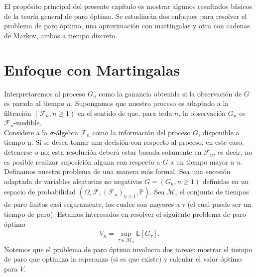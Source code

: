 El propósito principal del presente capítulo es mostrar algunos resultados básicos de la teoría general de paro óptimo. Se estudiarán dos enfoques para resolver el problema de paro óptimo, una aproximación con martingalas y otra con cadenas de Markov, ambos a tiempo discreto. 


\section{Enfoque con Martingalas}
Interpretaremos al proceso $G_n$ como la ganancia obtenida si la observación de $G$ es parada al tiempo $n$. Supongamos que nuestro proceso es adaptado a la filtración $(\mathcal{F}_n, n \geq 1)$ en el sentido de que, para toda $n$, la observación $G_n$ es $\mathcal{F}_n$-medible. \\

Considere a la $\sigma$-álgebra $\mathcal{F}_n$ como la información del proceso $G$, disponible a tiempo n. Si se desea tomar una decisión con respecto al proceso, en este caso, detenerse o no; esta resolución deberá estar basada solamente en $\mathcal{F}_n$, es decir, no es posible realizar suposición alguna con respecto a $G$ a un tiempo mayor a $n$. \\

Definamos nuestro problema de una manera más formal. Sea una sucesión adaptada de variables aleatorias no negativas $G = (G_n, n \geq 1)$ definidas en un espacio de probabilidad $(\Omega, \mathcal{F}, (\mathcal{F}_n)_{n \geq 1}, \mathbb{P})$. Sea $\mathcal{M}_\tau$ el conjunto de tiempos de paro finitos casi seguramente, los cuales son mayores a $\tau$ (el cual puede ser un tiempo de paro). Estamos interesados en resolver el siguiente problema de paro óptimo
	\begin{align}
	V_n = \sup_{\tau \in \mathcal{M}_n} \mathbb{E}[G_\tau]. \label{abb}
	\end{align}
Notemos que el problema de paro óptimo involucra dos tareas: mostrar el tiempo de paro que optimiza la esperanza (si es que existe) y calcular el valor óptimo para $V$. \\

